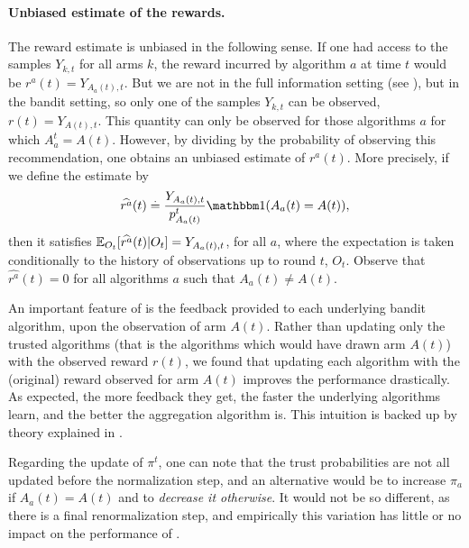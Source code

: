 \paragraph{Unbiased estimate of the rewards.}
%
The reward estimate is unbiased in the following sense. If one had access to the samples $Y_{k,t}$ for all arms $k$, the reward incurred by algorithm $a$ at time $t$ would be $r^a(t) = Y_{A_a(t),t}$.
But we are not in the full information setting (see \cite{CesaLugosi06}), but in the bandit setting, so only one of the samples $Y_{k,t}$ can be observed, $r(t)=Y_{A(t),t}$.
This quantity can only be observed for those algorithms $a$ for which $A_{a}^{t}=A(t)$.
However, by dividing by the probability of observing this recommendation, one obtains an unbiased estimate of $r^a(t)$. More precisely, if we define the estimate by
\begin{equation}
	\widehat{r^a}(t) \eqdef \frac{Y_{A_a(t),t}}{p_{A_a(t)}^{t}} \indic(A_a(t) = A(t)),
\end{equation}
then it satisfies $\mathbb{E}_{O_t}[\widehat{r^a}(t) | O_t] = Y_{A_a(t),t}$, for all $a$, where the expectation is taken conditionally to the history of observations up to round $t$, $O_t$.
%
Observe that $\widehat{r^a}(t) = 0$ for all algorithms $a$ such that $A_a(t) \neq A(t)$.


An important feature of \Aggr{} is the feedback provided to each underlying bandit algorithm, upon the observation of arm $A(t)$. Rather than updating only the trusted algorithms (that is the algorithms which would have drawn arm $A(t)$) with the observed reward $r(t)$, we found that updating each algorithm with the (original) reward observed for arm $A(t)$ improves the performance drastically.
%
As expected, the more feedback they get, the faster the underlying algorithms learn, and the better the aggregation algorithm is.
This intuition is backed up by theory explained in \cite{Maillard11}.


Regarding the update of $\pi^t$, one can note that the trust probabilities are not all updated before the normalization step,
and an alternative would be to
increase $\pi_{a}$ if $A_a(t) = A(t)$ and to \emph{decrease it otherwise}.
It would not be so different, as there is a final renormalization step, and empirically this variation has little or no impact on the performance of \Aggr{}.



